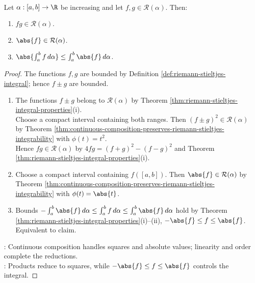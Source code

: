 \begin{theorem} \label{thm:products-and-absolute-values-riemann-stieltjes} \\
Let $\alpha:[a,b]\to\R$ be increasing and let $f,g\in\mathcal{R}(\alpha)$. Then:
\begin{enumerate}[label=(\roman*)]
\setlength{\itemsep}{0pt}
\item $fg\in\mathcal{R}(\alpha)$.
\item $\abs{f}\in\mathcal{R}(\alpha)$.
\item $\abs{\int_a^b f\,d\alpha}\leq\int_a^b\abs{f}\,d\alpha$.
\end{enumerate}
\begin{proof}
The functions $f,g$ are bounded by Definition \ref{def:riemann-stieltjes-integral}; hence $f\pm g$ are bounded.
\begin{enumerate}[label=(\roman*)]
\setlength{\itemsep}{0pt}
\item The functions $f\pm g$ belong to $\mathcal{R}(\alpha)$ by Theorem \ref{thm:riemann-stieltjes-integral-properties}(i).\\
Choose a compact interval containing both ranges. Then $(f\pm g)^2\in\mathcal{R}(\alpha)$ by Theorem \ref{thm:continuous-composition-preserves-riemann-stieltjes-integrability} with $\phi(t)=t^2$.\\
Hence $fg\in\mathcal{R}(\alpha)$ by $4fg=(f+g)^2-(f-g)^2$ and Theorem \ref{thm:riemann-stieltjes-integral-properties}(i).
\item Choose a compact interval containing $f([a,b])$. Then $\abs{f}\in\mathcal{R}(\alpha)$ by Theorem \ref{thm:continuous-composition-preserves-riemann-stieltjes-integrability} with $\phi(t)=\abs{t}$.
\item Bounds $-\int_a^b\abs{f}\,d\alpha\leq\int_a^b f\,d\alpha\leq\int_a^b\abs{f}\,d\alpha$ hold by Theorem \ref{thm:riemann-stieltjes-integral-properties}(i)--(ii),  $-\abs{f}\leq f\leq\abs{f}$. Equivalent to claim.
\end{enumerate}
: Continuous composition handles squares and absolute values; linearity and order complete the reductions.\\
: Products reduce to squares, while $-\abs{f}\leq f\leq\abs{f}$ controls the integral.
\end{proof}
\end{theorem}
